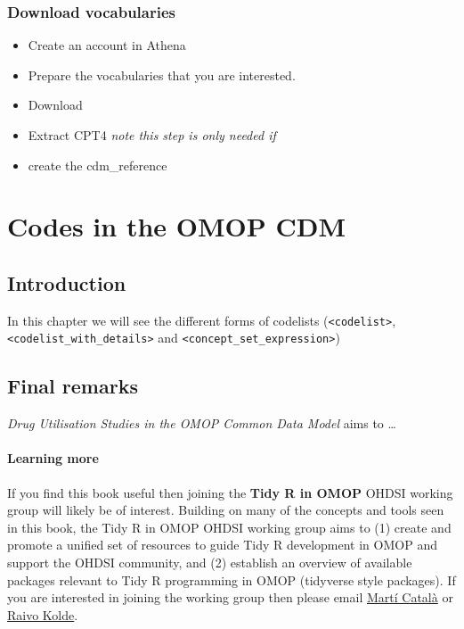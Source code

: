 \documentclass[
  letterpaper,
  oneside,
  open=any]{scrbook}
\providecommand{\tightlist}{%
  \setlength{\itemsep}{0pt}\setlength{\parskip}{0pt}}
\begin{document}
\section{Download vocabularies}\label{download-vocabularies-1}

\begin{itemize}
\tightlist
\item
  Create an account in Athena
\item
  Prepare the vocabularies that you are interested.
\item
  Download
\item
  Extract CPT4 \emph{note this step is only needed if }
\item
  create the cdm\_reference
\end{itemize}

\part{Codes in the OMOP CDM}

\chapter{Introduction}\label{introduction-1}

In this chapter we will see the different forms of codelists
(\texttt{\textless{}codelist\textgreater{}},
\texttt{\textless{}codelist\_with\_details\textgreater{}} and
\texttt{\textless{}concept\_set\_expression\textgreater{}})


\chapter*{Final remarks}\label{final-remarks}


\emph{Drug Utilisation Studies in the OMOP Common Data Model} aims to
\ldots{}

\subsection*{Learning more}\label{learning-more}

If you find this book useful then joining the \textbf{Tidy R in OMOP}
OHDSI working group will likely be of interest. Building on many of the
concepts and tools seen in this book, the Tidy R in OMOP OHDSI working
group aims to (1) create and promote a unified set of resources to guide
Tidy R development in OMOP and support the OHDSI community, and (2)
establish an overview of available packages relevant to Tidy R
programming in OMOP (tidyverse style packages). If you are interested in
joining the working group then please email
\href{mailto:catalasabate@ohdsi.org}{Martí Català} or
\href{mailto:kolde@ohdsi.org}{Raivo Kolde}.
\end{document}
